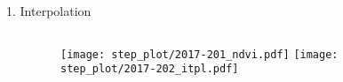 
\begin{frame}[t]{1. Interpolation}
    \begin{columns}
        \begin{column}{0.45\textwidth}

        \end{column}
        \begin{column}{0.42\textwidth}
            \begin{figure}
                \vspace{-1.8cm}
                \texttt{[image: step\_plot/2017-201\_ndvi.pdf]}
                \texttt{[image: step\_plot/2017-202\_itpl.pdf]}
            \end{figure}
        \end{column}
    \end{columns}
\end{frame}


